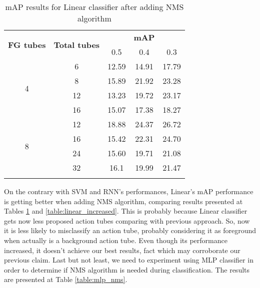 \begin{center}
  \begin{longtable}{|| c | c || c c c ||}
    \hline
    \multirow{2}{*}{\textbf{FG tubes}} & \multirow{2}{*}{\textbf{Total tubes}} & {} & \textbf{mAP} & {} \\
    {} & {} & 0.5 & 0.4 & 0.3 \\
    \hline
    \multirow{4}{*}{4} & 6 & 12.59 & 14.91 & 17.79  \\
    \cline{2-5}
    {} & 8 & 15.89 & 21.92 & 23.28 \\
    \cline{2-5}
    {} & 12 & 13.23 & 19.72 & 23.17 \\
    \cline{2-5}
    {} & 16 & 15.07 & 17.38 & 18.27 \\
    \hline
    \multirow{4}{*}{8} & 12 & 18.88 & 24.37 & 26.72 \\
    \cline{2-5}
    {} & 16 & 15.42 & 22.31 & 24.70 \\
    \cline{2-5}
    {} & 24 & 15.60 & 19.71 & 21.08 \\
    \cline{2-5}
    {} & 32 & 16.1 & 19.99 & 21.47 \\
    \hline

  \caption{mAP results for Linear classifier after adding NMS algorithm}
  \label{table:linear_nms}
\end{longtable}
\end{center}

On the contrary with SVM and RNN's performances, Linear's mAP performance is getting better when adding NMS algorithm, comparing results presented at
Tables \ref{table:linear_nms} and  \ref{table:linear_increased}. This is probably because Linear classifier gets now less proposed action tubes comparing with
previous approach. So, now it is less likely to misclassify an action tube, probably considering it as foreground when actually is a background action tube.
Even though its performance increased, it doesn't achieve our best results, fact which may corroborate our previous claim.
Last but not least, we need to experiment using MLP classifier in order to determine if NMS algorithm is needed during classification. The results are presented at
Table \ref{table:mlp_nms}.

